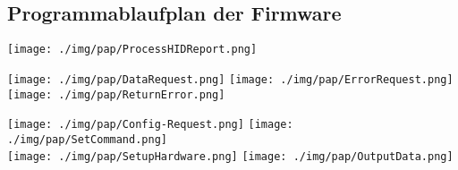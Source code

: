 \subsection{Programmablaufplan der Firmware}
\texttt{[image: ./img/pap/ProcessHIDReport.png]}

\begin{center}
\texttt{[image: ./img/pap/DataRequest.png]}
\texttt{[image: ./img/pap/ErrorRequest.png]}
\texttt{[image: ./img/pap/ReturnError.png]}
\end{center}

\texttt{[image: ./img/pap/Config-Request.png]}
\texttt{[image: ./img/pap/SetCommand.png]}\\

\texttt{[image: ./img/pap/SetupHardware.png]}
\texttt{[image: ./img/pap/OutputData.png]}
